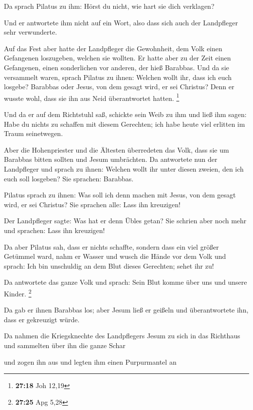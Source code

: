  Da sprach Pilatus zu ihm: Hörst du nicht, wie hart sie
dich verklagen?

 Und er antwortete ihm nicht auf ein Wort, also dass sich
auch der Landpfleger sehr verwunderte.

 Auf das Fest aber hatte der Landpfleger die Gewohnheit,
dem Volk einen Gefangenen loszugeben, welchen sie wollten.
 Er hatte aber zu der Zeit einen Gefangenen, einen
sonderlichen vor anderen, der hieß Barabbas.  Und da sie
versammelt waren, sprach Pilatus zu ihnen: Welchen wollt ihr, dass ich
euch losgebe? Barabbas oder Jesus, von dem gesagt wird, er sei Christus?
 Denn er wusste wohl, dass sie ihn aus Neid überantwortet
hatten. \footnote{\textbf{27:18} Joh 12,19}

 Und da er auf dem Richtstuhl saß, schickte sein Weib zu
ihm und ließ ihm sagen: Habe du nichts zu schaffen mit diesem Gerechten;
ich habe heute viel erlitten im Traum seinetwegen.

 Aber die Hohenpriester und die Ältesten überredeten das
Volk, dass sie um Barabbas bitten sollten und Jesum umbrächten.
 Da antwortete nun der Landpfleger und sprach zu ihnen:
Welchen wollt ihr unter diesen zweien, den ich euch soll losgeben? Sie
sprachen: Barabbas.

 Pilatus sprach zu ihnen: Was soll ich denn machen mit
Jesus, von dem gesagt wird, er sei Christus? Sie sprachen alle: Lass ihn
kreuzigen!

 Der Landpfleger sagte: Was hat er denn Übles getan? Sie
schrien aber noch mehr und sprachen: Lass ihn kreuzigen!

 Da aber Pilatus sah, dass er nichts schaffte, sondern
dass ein viel größer Getümmel ward, nahm er Wasser und wusch die Hände
vor dem Volk und sprach: Ich bin unschuldig an dem Blut dieses
Gerechten; sehet ihr zu!

 Da antwortete das ganze Volk und sprach: Sein Blut komme
über uns und unsere Kinder. \footnote{\textbf{27:25} Apg 5,28}

 Da gab er ihnen Barabbas los; aber Jesum ließ er geißeln
und überantwortete ihn, dass er gekreuzigt würde.

 Da nahmen die Kriegsknechte des Landpflegers Jesum zu
sich in das Richthaus und sammelten über ihn die ganze Schar

 und zogen ihn aus und legten ihm einen Purpurmantel an

